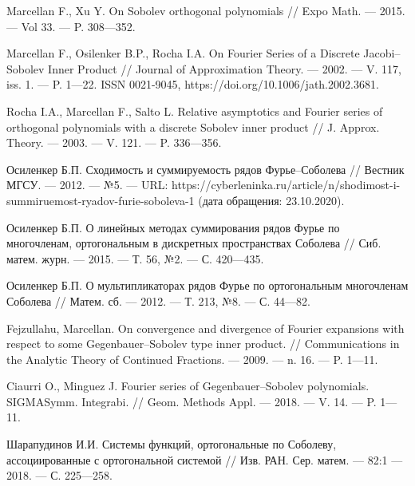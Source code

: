 \begin{thebibliography}{99}
Marcellan F., Xu Y.
On Sobolev orthogonal polynomials
//
Expo Math.
--- 2015.
--- Vol 33.
--- P. 308---352.




Marcellan F., Osilenker B.P., Rocha I.A.
On Fourier Series of a Discrete Jacobi--Sobolev Inner Product
//
Journal of Approximation Theory.
--- 2002.
--- V. 117, iss. 1.
--- P. 1---22.
ISSN 0021-9045, https://doi.org/10.1006/jath.2002.3681.




Rocha I.A., Marcellan F., Salto L.
Relative asymptotics and Fourier series of orthogonal polynomials with a discrete Sobolev inner product
//
J. Approx. Theory.
--- 2003.
--- V. 121.
--- P. 336---356.




Осиленкер Б.П.
Сходимость и суммируемость рядов Фурье--Соболева
//
Вестник МГСУ.
--- 2012.
--- №5.
--- URL: https://cyberleninka.ru/article/n/shodimost-i-summiruemost-ryadov-furie-soboleva-1 (дата обращения: 23.10.2020).




Осиленкер Б.П.
О линейных методах суммирования рядов Фурье по многочленам, ортогональным в дискретных пространствах Соболева
//
Сиб. матем. журн.
--- 2015.
--- Т. 56, №2.
--- С. 420---435.	




Осиленкер Б.П.
О мультипликаторах рядов Фурье по ортогональным многочленам Соболева
//
Матем. сб.
--- 2012.
--- Т. 213, №8.
--- С. 44---82.	




Fejzullahu, Marcellan.
On convergence and divergence of Fourier expansions with respect to some Gegenbauer--Sobolev type inner product.
//
Communications in the Analytic Theory of Continued Fractions.
--- 2009.
--- n. 16.
--- P. 1---11.




Ciaurri O., Minguez J.
Fourier series of Gegenbauer--Sobolev polynomials. SIGMASymm. Integrabi.
//
Geom. Methods Appl.
--- 2018.
--- V. 14.
--- P. 1---11.




Шарапудинов И.И.
Системы функций, ортогональные по Соболеву, ассоциированные с ортогональной системой
//
Изв. РАН. Сер. матем.
--- 82:1
--- 2018.
--- С. 225---258.





\end{thebibliography}
